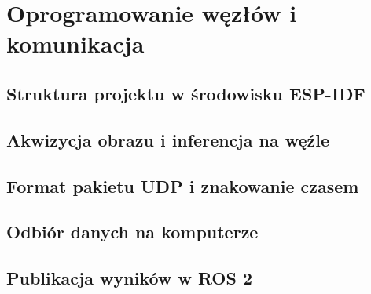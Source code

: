 \chapter{Oprogramowanie węzłów i komunikacja}
\label{chap:oprogramowanie}

\section{Struktura projektu w środowisku ESP-IDF}
\label{sec:esp-idf}

\section{Akwizycja obrazu i inferencja na węźle}
\label{sec:inferencja}

\section{Format pakietu UDP i znakowanie czasem}
\label{sec:pakiet-udp}

\section{Odbiór danych na komputerze}
\label{sec:odbior}

\section{Publikacja wyników w ROS 2}
\label{sec:ros2}

